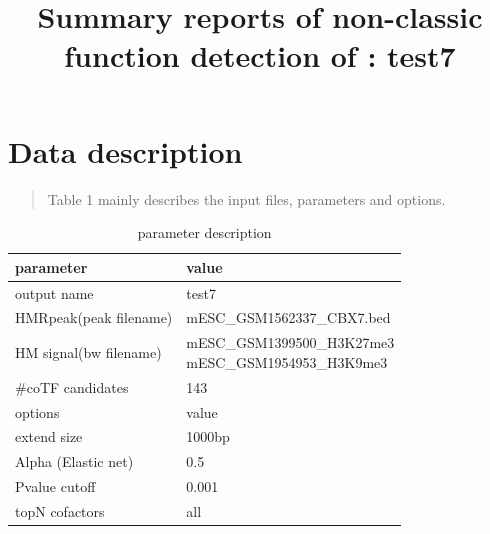 \documentclass[11pt,a4paper]{article}
\begin{document}
\title{Summary reports of non-classic function detection of : test7}

\vspace{-1cm}
\maketitle
\tableofcontents
\newpage
\newpage
\section{Data description}
\begin{quotation}
Table 1 mainly describes the input files, parameters and options.
\end{quotation}
\begin{table}[h]
\small
\caption{parameter description}\label{bstable}
\begin{tabularx}{\textwidth}{ |l|X| }

      
\hline
parameter & value  \\
\hline
output name & test7 \\
\hline
HMRpeak(peak filename) & mESC\_GSM1562337\_CBX7.bed \\
\hline
HM signal(bw filename) & \makecell{mESC\_GSM1399500\_H3K27me3\\mESC\_GSM1954953\_H3K9me3}  \\
\hline
\#coTF candidates & 143 \\
\hline
options & value \\
\hline
extend size & 1000bp \\
\hline
Alpha (Elastic net) & 0.5 \\
\hline
Pvalue cutoff & 0.001 \\
\hline
topN cofactors & all \\
\hline

\end{tabularx}
\end{table}

\newpage
\newpage
\end{document}

